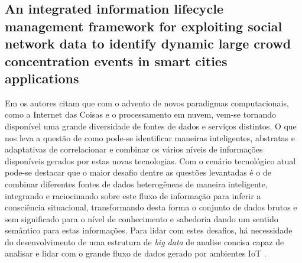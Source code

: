 \documentclass[ti,table]{texufpel} %
\begin{document}
     

  

  

\subsection{An integrated information lifecycle management framework for exploiting social network data to identify dynamic large crowd concentration events in smart cities applications} 

  

    Em \cite{art9kousiouris2018integrated} os autores citam que com o advento de novos paradigmas computacionais, como a Internet das Coisas e o processamento em nuvem, vem-se tornando disponível uma grande diversidade de fontes de dados e serviços distintos. O que nos leva a questão de como pode-se identificar maneiras inteligentes, abstratas e adaptativas de correlacionar e combinar os vários níveis de informações disponíveis gerados por estas novas tecnologias. Com o cenário tecnológico atual pode-se destacar que o maior desafio dentre as questões levantadas é o de combinar diferentes fontes de dados heterogêneas de maneira inteligente, integrando e raciocinando sobre este fluxo de informação para inferir a consciência situacional, transformando desta forma o conjunto de dados brutos e sem significado para o nível de conhecimento e sabedoria dando um sentido semântico para estas informações. Para lidar com estes desafios, há necessidade do desenvolvimento de uma estrutura de \textit{big data} de analise concisa capaz de analisar e lidar com o grande fluxo de dados gerado por ambientes IoT .     

     
\end{document}
